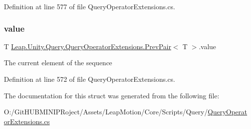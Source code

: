Definition at line 577 of file Query\+Operator\+Extensions.\+cs.

\mbox{\label{struct_leap_1_1_unity_1_1_query_1_1_query_operator_extensions_1_1_prev_pair_a01956bf6e655db87578d104e252986e8}} 
\subsubsection{\texorpdfstring{value}{value}}
{\footnotesize\ttfamily T \mbox{\hyperlink{struct_leap_1_1_unity_1_1_query_1_1_query_operator_extensions_1_1_prev_pair}{Leap.\+Unity.\+Query.\+Query\+Operator\+Extensions.\+Prev\+Pair}}$<$ T $>$.value}



The current element of the sequence 



Definition at line 572 of file Query\+Operator\+Extensions.\+cs.



The documentation for this struct was generated from the following file\+:\begin{DoxyCompactItemize}
\item 
O\+:/\+Git\+H\+U\+B\+M\+I\+N\+I\+P\+Roject/\+Assets/\+Leap\+Motion/\+Core/\+Scripts/\+Query/\mbox{\hyperlink{_query_operator_extensions_8cs}{Query\+Operator\+Extensions.\+cs}}\end{DoxyCompactItemize}
